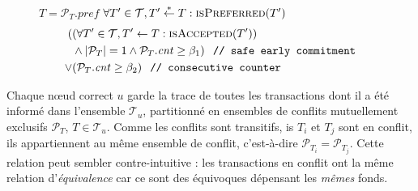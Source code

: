 \begin{figure}[t]
\begin{center}
\small
\begin{algorithmic}[1]
        \State \Return $T = \mathcal{P}_T\mathit{.pref}$
    \EndFunction
        \State \Return $\forall T'\in\mathcal{T}, T' \stackrel{*}{\gets} T: \Call{isPreferred}{T'}$
    \EndFunction
        \State\Return
            \vspace*{-.5\baselineskip}
        \begin{align*}
            (&(\forall T' \in \mathcal{T}, T' \gets T: \Call{isAccepted}{T'}) \\
                &\land |\mathcal{P}_T| = 1 \land \mathcal{P}_T\mathit{.cnt} \ge \beta_1) \texttt{\hspace{.1in}// safe early commitment} \\
            \lor &(%
            \mathcal{P}_T\mathit{.cnt} \ge \beta_2)\texttt{\hspace{.1in}// consecutive counter}
        \end{align*}
    \EndFunction
        \State {}
        \State {}
    \EndProcedure
    \label{fig:gossipchain-onquery}
\end{algorithmic}
\end{center}
\end{figure}

Chaque nœud correct $u$ garde la trace de toutes les transactions dont il a été informé dans l'ensemble $\mathcal{T}_u$, partitionné en ensembles de conflits mutuellement exclusifs $\mathcal{P}_T$, $T \in \mathcal{T}_u$.
Comme les conflits sont transitifs, is $T_i$ et $T_j$ sont en conflit, ils appartiennent au même ensemble de conflit, c'est-à-dire $\mathcal{P}_{T_i} = \mathcal{P}_{T_j}$. Cette relation peut sembler contre-intuitive : les transactions en conflit ont la même relation d'\emph{équivalence} car ce sont des équivoques dépensant les \emph{mêmes} fonds.

